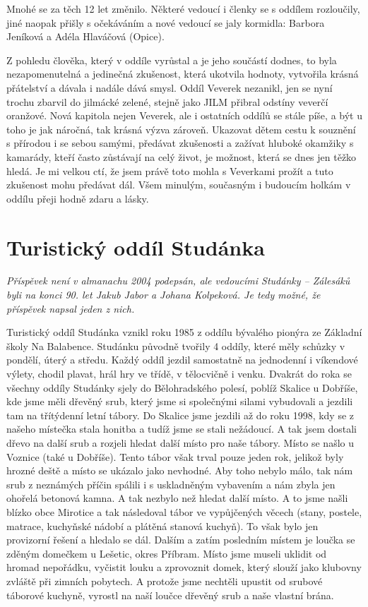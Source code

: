 Mnohé se za těch 12 let změnilo. Některé vedoucí i členky se s oddílem
rozloučily, jiné naopak přišly s očekáváním a nové vedoucí se jaly
kormidla: Barbora Jeníková a Adéla Hlaváčová (Opice).

Z pohledu člověka, který v oddíle vyrůstal a je jeho součástí dodnes, to
byla nezapomenutelná a jedinečná zkušenost, která ukotvila hodnoty,
vytvořila krásná přátelství a dávala i nadále dává smysl. Oddíl Veverek
nezanikl, jen se nyní trochu zbarvil do jilmácké zelené, stejně jako
JILM přibral odstíny veverčí oranžové. Nová kapitola nejen Veverek, ale
i ostatních oddílů se stále píše, a být u toho je jak náročná, tak
krásná výzva zároveň. Ukazovat dětem cestu k souznění s přírodou i se
sebou samými, předávat zkušenosti a zažívat hluboké okamžiky s kamarády,
kteří často zůstávají na celý život, je možnost, která se dnes jen těžko
hledá. Je mi velkou ctí, že jsem právě toto mohla s Veverkami prožít a
tuto zkušenost mohu předávat dál. Všem minulým, současným i budoucím
holkám v oddílu přeji hodně zdaru a lásky.

\section{Turistický oddíl
Studánka}\label{turistickuxfd-odduxedl-studuxe1nka}

\emph{Příspěvek není v almanachu 2004 podepsán, ale vedoucími Studánky
-- Zálesáků byli na konci 90. let Jakub Jabor a Johana Kolpeková. Je
tedy možné, že příspěvek napsal jeden z nich.}

Turistický oddíl Studánka vznikl roku 1985 z oddílu bývalého pionýra ze
Základní školy Na Balabence. Studánku původně tvořily 4 oddíly, které
měly schůzky v pondělí, úterý a středu. Každý oddíl jezdil samostatně na
jednodenní i víkendové výlety, chodil plavat, hrál hry ve třídě, v
tělocvičně i venku. Dvakrát do roka se všechny oddíly Studánky sjely do
Bělohradského polesí, poblíž Skalice u Dobříše, kde jsme měli dřevěný
srub, který jsme si společnými silami vybudovali a jezdili tam na
třítýdenní letní tábory. Do Skalice jsme jezdili až do roku 1998, kdy se
z našeho místečka stala honitba a tudíž jsme se stali nežádoucí. A tak
jsem dostali dřevo na další srub a rozjeli hledat další místo pro naše
tábory. Místo se našlo u Voznice (také u Dobříše). Tento tábor však
trval pouze jeden rok, jelikož byly hrozné deště a místo se ukázalo jako
nevhodné. Aby toho nebylo málo, tak nám srub z neznámých příčin spálili
i s uskladněným vybavením a nám zbyla jen ohořelá betonová kamna. A tak
nezbylo než hledat další místo. A to jsme našli blízko obce Mirotice a
tak následoval tábor ve vypůjčených věcech (stany, postele, matrace,
kuchyňské nádobí a plátěná stanová kuchyň). To však bylo jen provizorní
řešení a hledalo se dál. Dalším a zatím posledním místem je loučka se
zděným domečkem u Lešetic, okres Příbram. Místo jsme museli uklidit od
hromad nepořádku, vyčistit louku a zprovoznit domek, který slouží jako
klubovny zvláště při zimních pobytech. A protože jsme nechtěli upustit
od srubové táborové kuchyně, vyrostl na naší loučce dřevěný srub a naše
vlastní brána.

